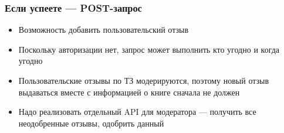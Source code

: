 \documentclass{../../slides-style}
\begin{document}
    \begin{frame}
        \frametitle{Если успеете --- POST-запрос}
        \begin{itemize}
            \item Возможность добавить пользовательский отзыв
            \item Поскольку авторизации нет, запрос может выполнить кто угодно и когда угодно
            \item Пользовательские отзывы по ТЗ модерируются, поэтому новый отзыв выдаваться вместе с информацией о книге сначала не должен
            \item Надо реализовать отдельный API для модератора --- получить все неодобренные отзывы, одобрить данный
        \end{itemize}
    \end{frame}
\end{document}
